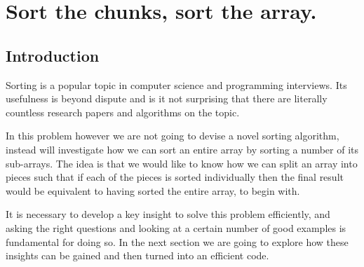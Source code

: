 %



\chapter{Sort the chunks, sort the array.}
\label{ch:max_num_chunks_sorted}
\section*{Introduction}

Sorting is a popular topic in computer science and programming interviews. 
Its usefulness is beyond dispute and is it not surprising that there are literally
countless research papers and algorithms on the topic. 

In this problem however we are not going to devise a novel sorting algorithm, instead will investigate how we can sort an entire array by sorting a number of its sub-arrays.
The idea is that we would like to know how we can split an array into pieces such that if each of the pieces is sorted 
individually then the final result would be equivalent to having sorted the entire array, to begin with.

It is necessary to develop a key insight to solve this problem efficiently, 
and asking the right questions and looking at a certain number of good examples
is fundamental for doing so. In the next section we are going to explore how these insights can be gained and then turned into an efficient code. 

